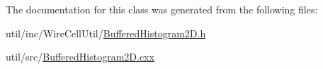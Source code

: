 The documentation for this class was generated from the following files\+:\begin{DoxyCompactItemize}
\item 
util/inc/\+Wire\+Cell\+Util/\hyperlink{_buffered_histogram2_d_8h}{Buffered\+Histogram2\+D.\+h}\item 
util/src/\hyperlink{_buffered_histogram2_d_8cxx}{Buffered\+Histogram2\+D.\+cxx}\end{DoxyCompactItemize}
